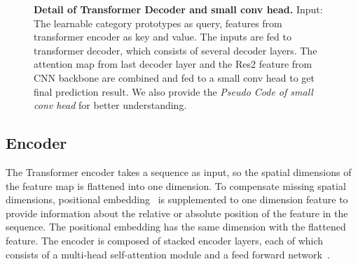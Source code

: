 \documentclass{article}
\begin{document}
\begin{figure*}[t]
    \centering
    \caption{\textbf{The whole pipeline of our hybrid CNN-Transformer architecture.}
    First, the input image is fed to CNN to extract features . 
Second, for transformer encoder, the features and position embedding are flatten and fed to transformer for self-attention, and output feature() from transformer encoder. 
Third, for transformer decoder, we specifically \textbf{define a set of learnable class prototype embeddings() as query,  as key}, and calculate the attention map with  and . Each class prototype embedding corresponds to a category of final prediction. We also add a small conv head to fuse attention map and Res2 feature from CNN backbone. Details of transformer decoder and small conv head refer to Figure~\ref{fig:decoder}.
Finally, we can get the predict results by doing pixel-wise argmax on the attention map.
For example, in this figure, the segmentation mask of two categories~(\textbf{\textcolor[RGB]{137,0,56}{Bottle}} and \textbf{\textcolor[RGB]{129,129,129}{Eyeglass}}) corresponds to two class prototypes with same colors.
    }
    \label{fig:Figure3}
    \vspace{-10pt}
\end{figure*}



\begin{figure}[H]
    \centering
    \caption{\textbf{Detail of Transformer Decoder and small conv head.} Input: The learnable category prototypes as query, features from transformer encoder as key and value. The inputs are fed to transformer decoder, which consists of several decoder layers. The attention map from last decoder layer and the Res2 feature from CNN backbone are combined and fed to a small conv head to get final prediction result. We also provide the \textit{Pseudo Code of small conv head} for better understanding. 
    }
    \label{fig:decoder}
\end{figure}


\subsection{Encoder}
The Transformer encoder takes a sequence as input, so the spatial dimensions of the feature map  is flattened into one dimension. To compensate missing spatial dimensions, positional embedding~\cite{posencoding} is supplemented to one dimension feature to provide information about the relative or absolute position of the feature in the sequence. The positional embedding has the same dimension  with the flattened feature. The encoder is composed of stacked encoder layers, each of which consists of a multi-head self-attention module and a feed forward network~\cite{vaswani2017attention}.
\end{document}
